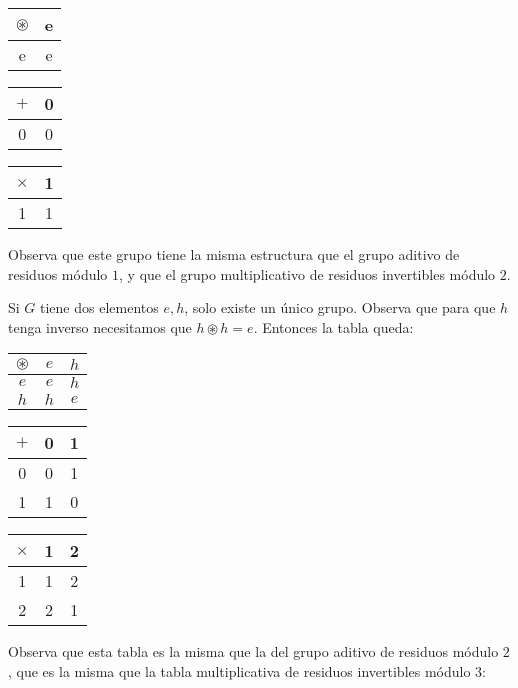 \begin{tabular}{|c||c|} 
 \hline
  $\circledast$ & e  \\ 
  \hline
  \hline
  e &  e \\ 
  \hline
\end{tabular}
\hspace{1cm}
\begin{tabular}{|c||c|} 
 \hline
  $+$ & 0  \\ 
  \hline
  \hline
  0 &  0 \\ 
  \hline
\end{tabular}
\hspace{1cm}
\begin{tabular}{|c||c|} 
 \hline
  $\times$ & 1  \\ 
  \hline
  \hline
  1 &  1 \\ 
  \hline
\end{tabular}

Observa que este grupo tiene la misma estructura que el grupo aditivo de residuos módulo $1$, y que el grupo multiplicativo de residuos invertibles módulo $2$.

Si $G$ tiene dos elementos $e,h$, solo existe un único grupo. Observa que para que $h$ tenga inverso necesitamos que $h\circledast h=e$. Entonces la tabla queda:

\begin{tabular}{|c||c|c|} 
 \hline
  $\circledast$ & $e$ & $h$ \\ 
  \hline
  \hline
  $e$ & $e$ & $h$  \\ 
  \hline
  $h$ & $h$ & $e$ \\ 
  \hline
\end{tabular}
\hspace{1cm}
\begin{tabular}{|c||c|c|} 
 \hline
  $+$ & 0 & 1 \\ 
  \hline
  \hline
  0 & 0 & 1 \\ 
  \hline
  1 & 1 & 0 \\ 
  \hline
\end{tabular}
\hspace{1cm}
\begin{tabular}{|c||c|c|} 
 \hline
  $\times$ & 1 & 2 \\ 
  \hline
  \hline
  1 & 1 & 2 \\ 
  \hline
  2 & 2 & 1 \\ 
  \hline
\end{tabular}

Observa que esta tabla es la misma que la del grupo aditivo de residuos módulo $2$, que es la misma que la tabla multiplicativa de residuos invertibles módulo $3$:

